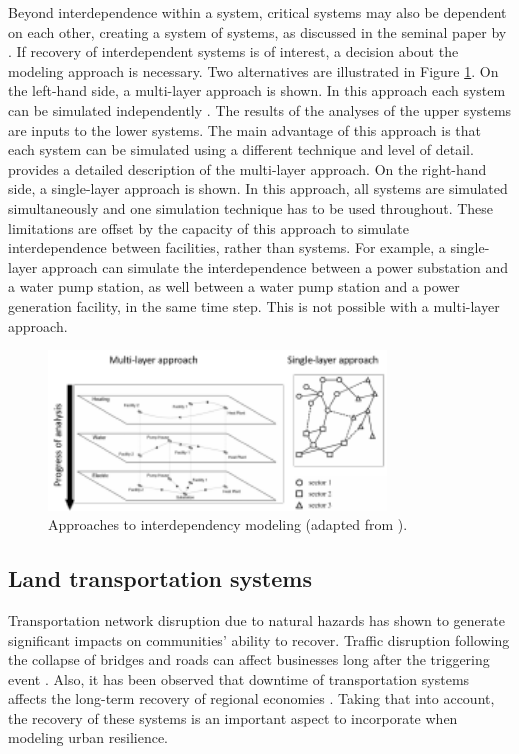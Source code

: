 Beyond interdependence within a system, critical systems may also be dependent on each other, creating a system of systems, as discussed in the seminal paper by \cite{rinaldi2001identifying}. If recovery of interdependent systems is of interest, a decision about the modeling approach is necessary. Two alternatives are illustrated in Figure \ref{fig:Interdependencies}. On the left-hand side, a multi-layer approach is shown. In this approach each system can be simulated independently \citep{guidotti2017multi}. The results of the analyses of the upper systems are inputs to the lower systems. The main advantage of this approach is that each system can be simulated using a different technique and level of detail. \cite[p.243]{cimellaro2016resilience} provides a detailed description of the multi-layer approach. On the right-hand side, a single-layer approach is shown. In this approach, all systems are simulated simultaneously and one simulation technique has to be used throughout. These limitations are offset by the capacity of this approach to simulate interdependence between facilities, rather than systems. For example, a single-layer approach can simulate the interdependence between a power substation and a water pump station, as well between a water pump station and a power generation facility, in the same time step. This is not possible with a multi-layer approach.\ 

\begin{figure}[htb]
    \centering
    \includegraphics[width=0.8\textwidth, angle = 0]{Figures/Interdependencies.pdf}
    \caption{Approaches to interdependency modeling (adapted from \cite{cimellaro2016resilience}).}
    \label{fig:Interdependencies}
\end{figure}

\subsection{Land transportation systems}
Transportation network disruption due to natural hazards has shown to generate significant impacts on communities' ability to recover. Traffic disruption following the collapse of bridges and roads can affect businesses long after the triggering event \citep{boarnet1998business}. Also, it has been observed that downtime of transportation systems affects the long-term recovery of regional economies \citep{chang2000transportation}. Taking that into account, the recovery of these systems is an important aspect to incorporate when modeling urban resilience. \

